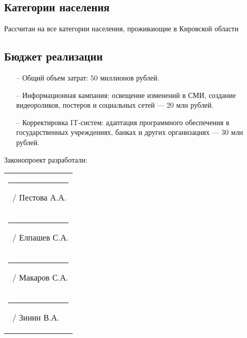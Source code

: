\documentclass[a4paper,14pt]{extarticle}
\begin{document}
	\subsection*{Категории населения}
	Рассчитан на все категории населения, проживающие в Кировской области
	
	\subsection*{Бюджет реализации}
	\begin{itemize}
		\item[--] Общий объем затрат: 50 миллионов рублей.
		
		\item[--] Информационная кампания: освещение изменений в СМИ, создание видеороликов, постеров и социальных сетей — 20 млн рублей.
		
		\item[--] Корректировка IT-систем: адаптация программного обеспечения в государственных учреждениях, банках и других организациях — 30 млн рублей.
	\end{itemize}
	
	\noindent Законопроект разработали:\\
	\noindent
	\begin{tabular}{l}
		\rule[-1mm]{30mm}{0.10mm}\, / Пестова А.А.\\
		\rule[-1mm]{30mm}{0.10mm}\, / Елпашев С.А.\\
		\rule[-1mm]{30mm}{0.10mm}\, / Макаров С.А.\\
		\rule[-1mm]{30mm}{0.10mm}\, / Зинин В.А.
	\end{tabular}
\end{document}
